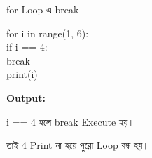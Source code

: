 
\begin{codeoutputbox}{\textenglish{\ttfamily for} Loop-এ \textenglish{\ttfamily break}}

\noindent
\begin{minipage}[t]{0.53\linewidth}
\codeheading

\begin{english}
\ttfamily
for i in range(1, 6):\\
\hspace*{4mm}if i == 4:\\
\hspace*{8mm}break\\
\hspace*{4mm}print(i)
\end{english}

\end{minipage}
\hfill
\begin{minipage}[t]{0.43\linewidth}
\outputheading

\textbf{Output:}

\begin{center}
\textenglish{  }
\end{center}

\textenglish{\ttfamily i == 4}
হলে
\textenglish{\ttfamily break}
Execute হয়।

তাই 4 Print না হয়ে পুরো Loop বন্ধ হয়।

\end{minipage}

\end{codeoutputbox}


